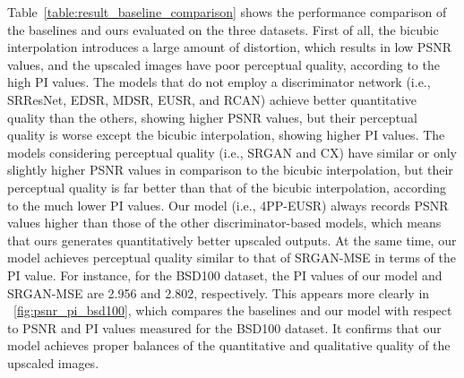 \documentclass[runningheads]{llncs}
\begin{document}
Table~\ref{table:result_baseline_comparison} shows the performance comparison of the baselines and ours evaluated on the three datasets.
First of all, the bicubic interpolation introduces a large amount of distortion, which results in low PSNR values, and the upscaled images have poor perceptual quality, according to the high PI values.
The models that do not employ a discriminator network (i.e., SRResNet, EDSR, MDSR, EUSR, and RCAN) achieve better quantitative quality than the others, showing higher PSNR values, but their perceptual quality is worse except the bicubic interpolation, showing higher PI values.
The models considering perceptual quality (i.e., SRGAN and CX) have similar or only slightly higher PSNR values in comparison to the bicubic interpolation, but their perceptual quality is far better than that of the bicubic interpolation, according to the much lower PI values.
Our model (i.e., 4PP-EUSR) always records PSNR values higher than those of the other discriminator-based models, which means that ours generates quantitatively better upscaled outputs.
At the same time, our model achieves perceptual quality similar to that of SRGAN-MSE in terms of the PI value.
For instance, for the BSD100 dataset, the PI values of our model and SRGAN-MSE are 2.956 and 2.802, respectively.
This appears more clearly in \figurename~\ref{fig:psnr_pi_bsd100}, which compares the baselines and our model with respect to PSNR and PI values measured for the BSD100 dataset.
It confirms that our model achieves proper balances of the quantitative and qualitative quality of the upscaled images.
\end{document}
